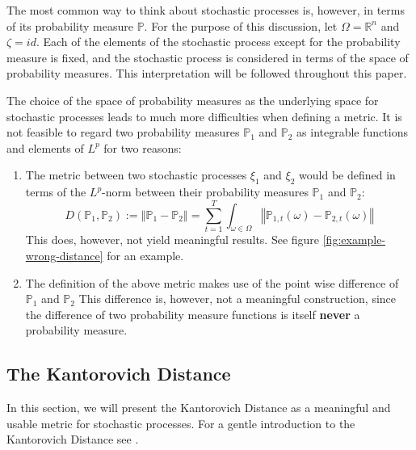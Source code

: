 The most common way to think about stochastic processes is, however, in terms of its probability measure $\mathbb{P}$.
For the purpose of this discussion, let $\Omega=\mathbb{R}^n$ and $\zeta=id$.
Each of the elements of the stochastic process except for the probability measure is fixed, and the stochastic process is considered in terms of the space of probability measures.
This interpretation will be followed throughout this paper.

The choice of the space of probability measures as the underlying space for stochastic processes leads to much more difficulties when defining a metric. It is not feasible to regard two probability measures $\mathbb{P}_1$ and $\mathbb{P}_2$ as integrable functions and elements of $L^p$ for two reasons:
\begin{enumerate}
\item The metric between two stochastic processes $\xi_1$ and $\xi_2$ would be defined in terms of the $L^p$-norm between their probability measures $\mathbb{P}_1$ and $\mathbb{P}_2$:
  \begin{equation}
    \label{eq:prob-measure-metric-as-Lpnorm}
    D(\mathbb{P}_1,\mathbb{P}_2) := \left\Vert \mathbb{P}_1-\mathbb{P}_2\right\Vert = \sum_{t=1}^T\int_{\omega\in\Omega}\left\Vert \mathbb{P}_{1,t}(\omega)-\mathbb{P}_{2,t}(\omega)\right\Vert
  \end{equation}
  This does, however, not yield meaningful results. See figure \ref{fig:example-wrong-distance} for an example.
\item The definition of the above metric makes use of the point wise difference of $\mathbb{P}_1$ and $\mathbb{P}_2$
  This difference is, however, not a meaningful construction, since the difference of two probability measure functions is itself \textbf{never} a probability measure.
\end{enumerate}

\subsection{The Kantorovich Distance}
\label{sec:kantoro}
In this section, we will present the Kantorovich Distance as a meaningful and usable metric for stochastic processes. For a gentle introduction to the Kantorovich Distance see \cite{Deng2009}.

